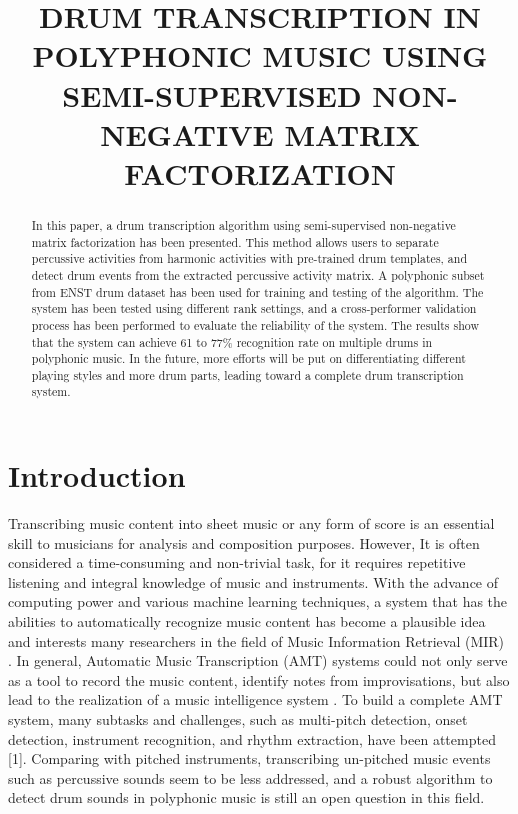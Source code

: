 \documentclass{article}
\title{DRUM TRANSCRIPTION IN POLYPHONIC MUSIC USING SEMI-SUPERVISED NON-NEGATIVE MATRIX FACTORIZATION}
\begin{document}
%
\maketitle
%
\begin{abstract}
In this paper, a drum transcription algorithm using semi-supervised non-negative matrix factorization has been presented. This method allows users to separate percussive activities from harmonic activities with pre-trained drum templates, and detect drum events from the extracted percussive activity matrix. A polyphonic subset from ENST drum dataset has been used for training and testing of the algorithm. The system has been tested using different rank settings, and a cross-performer validation process has been performed to evaluate the reliability of the system.  The results show that the system can achieve 61 to 77\% recognition rate on multiple drums in polyphonic music. In the future, more efforts will be put on differentiating different playing styles and more drum parts, leading toward a complete drum transcription system.

\end{abstract}
%

\section{Introduction}\label{sec:introduction}
Transcribing music content into sheet music or any form of score is an essential skill to musicians for analysis and composition purposes. However, It is often considered a time-consuming and non-trivial task, for it requires repetitive listening and integral knowledge of music and instruments. With the advance of computing power and various machine learning techniques, a system that has the abilities to automatically recognize music content has become a plausible idea and interests many researchers in the field of Music Information Retrieval (MIR) \cite{1}. In general, Automatic Music Transcription (AMT) systems could not only serve as a tool to record the music content, identify notes from improvisations, but also lead to the realization of a music intelligence system \cite{2}. To build a complete AMT system, many subtasks and challenges, such as multi-pitch detection, onset detection, instrument recognition, and rhythm extraction, have been attempted [1]. Comparing with pitched instruments, transcribing un-pitched music events such as percussive sounds seem to be less addressed, and a robust algorithm to detect drum sounds in polyphonic music is still an open question in this field.
\end{document}

